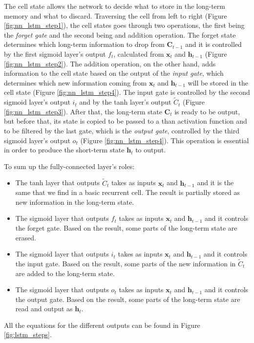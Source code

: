The cell state allows the network to decide what to store in the long-term memory and what to discard. Traversing the cell from left to right (Figure \ref{fig:nn_lstm_step1}), the cell states goes through two operations, the first being the \textit{forget gate} and the second being and addition operation. The forget state determines which long-term information to drop from $\mathbf{C}_{t-1}$ and it is controlled by the first sigmoid layer's output $f_t$, calculated from $\mathbf{x}_t$ and $\mathbf{h}_{t-1}$ (Figure \ref{fig:nn_lstm_step2}). The addition operation, on the other hand, adds information to the cell state based on the output of the \textit{input gate}, which determines which new information coming from $\mathbf{x}_t$ and $\mathbf{h}_{t-1}$ will be stored in the cell state (Figure \ref{fig:nn_lstm_step4}). The input gate is controlled by the second sigmoid layer's output $i_t$ and by the tanh layer's output $\tilde{C}_t$ (Figure \ref{fig:nn_lstm_step3}). After that, the long-term state $\mathbf{C}_t$ is ready to be output, but before that, its state is copied to be passed to a than activation function and to be filtered by the last gate, which is the \textit{output gate}, controlled by the third sigmoid layer's output $o_t$ (Figure \ref{fig:nn_lstm_step4}). This operation is essential in order to produce the short-term state $\mathbf{h}_t$ to output.

To sum up the fully-connected layer's roles:
\begin{itemize}
    \item The tanh layer that outputs $\tilde{C}_t$ takes as inputs $\mathbf{x}_t$ and $\mathbf{h}_{t-1}$ and it is the same that we find in a basic recurrent cell. The result is partially stored as new information in the long-term state.
    \item The sigmoid layer that outputs $f_t$ takes as inputs $\mathbf{x}_t$ and $\mathbf{h}_{t-1}$ and it controls the forget gate. Based on the result, some parts of the long-term state are erased.
    \item The sigmoid layer that outputs $i_t$ takes as inputs $\mathbf{x}_t$ and $\mathbf{h}_{t-1}$ and it controls the input gate. Based on the result, some parts of the new information in $\tilde{C}_t$ are added to the long-term state.
    \item The sigmoid layer that outputs $o_t$ takes as inputs $\mathbf{x}_t$ and $\mathbf{h}_{t-1}$ and it controls the output gate. Based on the result, some parts of the long-term state are read and output as $\mathbf{h}_t$.
\end{itemize}
All the equations for the different outputs can be found in Figure \ref{fig:lstm_steps}.

